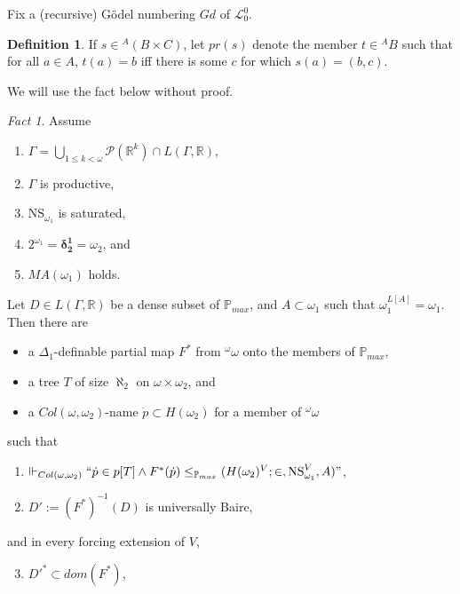 \documentclass[12pt, twoside]{memoir}
\numberwithin{equation}{section}
\theoremstyle{definition}
\newtheorem{defi}[thm]{Definition}
\theoremstyle{remark}
\newtheorem{fact}[thm]{Fact}
\theoremstyle{definition}
\theoremstyle{definition}
\theoremstyle{definition}
\theoremstyle{remark}
\begin{document}
Fix a (recursive) G\"{o}del numbering $Gd$ of $\mathcal{L}^0_0$.

\begin{defi}\label{nota4}
If $s \in {^{A}{(B \times C)}}$, let $pr(s)$ denote the member $t \in {^{A}{B}}$ such that for all $a \in A$, $t(a) = b$ iff there is some $c$ for which $s(a) = (b, c)$.
\end{defi}

We will use the fact below without proof.

\begin{fact}\label{fact434}
Assume
\begin{enumerate}[label=(\roman*), leftmargin=40pt]
    \item $\Gamma  = \bigcup_{1 \leq k < \omega} \mathcal{P}(\mathbb{R}^{k}) \cap L(\Gamma, \mathbb{R})$,
    \item $\Gamma$ is productive,
    \item $\mathrm{NS}_{\omega_1}$ is saturated,
    \item $2^{\omega_1} = \mathbf{\delta^1_2} = \omega_2$, and
    \item $MA(\omega_1)$ holds.
\end{enumerate}
Let $D \in L(\Gamma, \mathbb{R})$ be a dense subset of $\mathbb{P}_{max}$, and $A \subset \omega_1$ such that $\omega_1^{L[A]} = \omega_1$. Then there are
\begin{itemize}
    \item a $\Delta_1$-definable partial map $F^*$ from $^{\omega}{\omega}$ onto the members of $\mathbb{P}_{max}$,
    \item a tree $T$ of size $\aleph_2$ on $\omega \times \omega_2$, and
    \item a $Col(\omega, \omega_2)$-name $\dot{p} \subset H(\omega_2)$ for a member of ${^{\omega}{\omega}}$
\end{itemize}
such that 
\begin{enumerate}[label=(4.34.\arabic*), leftmargin=50pt]
    \item\label{4341} $\Vdash_{Col(\omega, \omega_2)} ``\dot{p} \in p[T] \wedge F^*(\dot{p}) \leq_{\mathbb{P}_{max}} (H(\omega_2)^V; \in, \mathrm{NS}_{\omega_1}^V, A)"$,
    \item\label{4342} $D' := (F^*)^{-1}(D)$ is universally Baire, 
\end{enumerate}
and in every forcing extension of $V$,
\begin{enumerate}[label=(4.34.\arabic*), leftmargin=50pt]
    \setcounter{enumi}{2}
    \item\label{4343} $D'^* \subset dom(F^*)$,

\end{enumerate}
\end{fact}
\end{document}
